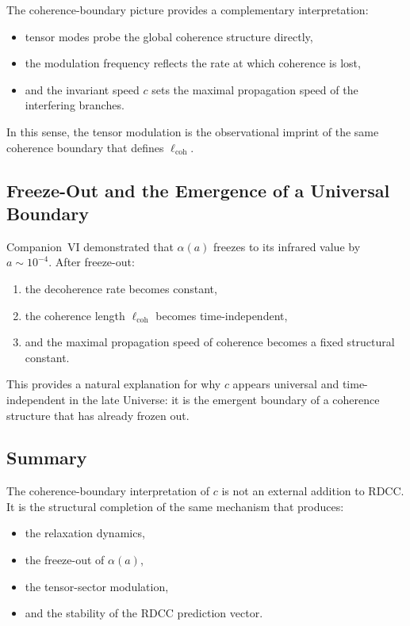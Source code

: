 \documentclass[11pt,a4paper]{article}
\begin{document}
The coherence-boundary picture provides a complementary interpretation:
\begin{itemize}
    \item tensor modes probe the global coherence structure directly,
    \item the modulation frequency reflects the rate at which coherence is lost,
    \item and the invariant speed $c$ sets the maximal propagation speed of the interfering
    branches.
\end{itemize}

In this sense, the tensor modulation is the observational imprint of the same coherence
boundary that defines $\ell_{\mathrm{coh}}$.

\subsection{Freeze-Out and the Emergence of a Universal Boundary}

Companion~VI demonstrated that $\alpha(a)$ freezes to its infrared value by $a \sim 10^{-4}$.
After freeze-out:
\begin{enumerate}
    \item the decoherence rate becomes constant,
    \item the coherence length $\ell_{\mathrm{coh}}$ becomes time-independent,
    \item and the maximal propagation speed of coherence becomes a fixed structural constant.
\end{enumerate}

This provides a natural explanation for why $c$ appears universal and time-independent in the
late Universe: it is the emergent boundary of a coherence structure that has already frozen out.

\subsection{Summary}

The coherence-boundary interpretation of $c$ is not an external addition to RDCC. It is the
structural completion of the same mechanism that produces:
\begin{itemize}
    \item the relaxation dynamics,
    \item the freeze-out of $\alpha(a)$,
    \item the tensor-sector modulation,
    \item and the stability of the RDCC prediction vector.
\end{itemize}
\end{document}
